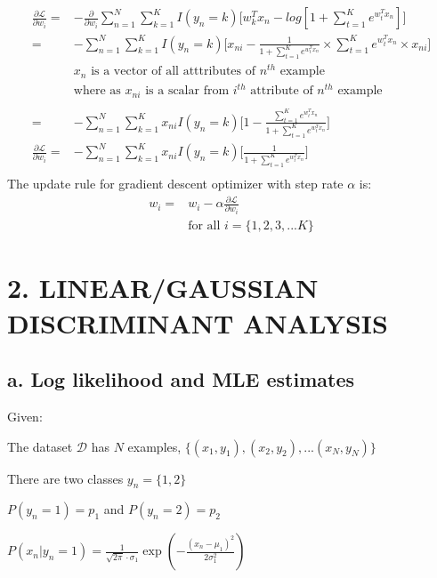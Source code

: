 \documentclass[letterpaper,doc,notimes]{apa6}
\begin{document}
{\begin{align*}
\frac{\partial \mathcal{L}}{\partial w_i} = & - \frac{\partial }{\partial w_i } \sum_{n=1}^{N} \sum_{k=1}^{K} I(y_n = k) \bigg[ w_k^Tx_n - log [1 +  \sum_{t=1}^{K} e^{w_t^Tx_n} ] \bigg ] \\
= & - \sum_{n=1}^{N} \sum_{k=1}^{K} I(y_n = k) \bigg[ x_{ni}  - \frac{1}{1 + \sum_{t=1}^{K} e^{w_t^Tx_n}} \times \sum_{t=1}^{K} e^{w_t^Tx_n} \times x_{ni} \bigg] \\
& \text{$x_n$ is a vector of all atttributes of $n^{th}$ example} 
\\ & \text{where as $x_{ni}$ is a scalar from $i^{th}$ attribute of $n^{th}$ example} \\
\\
= & - \sum_{n=1}^{N} \sum_{k=1}^{K} x_{ni} I(y_n = k) \bigg[ 1  - \frac{\sum_{t=1}^{K} e^{w_t^Tx_n}}{1 + \sum_{t=1}^{K} e^{w_t^Tx_n}}  \bigg] \\
\frac{\partial \mathcal{L}}{\partial w_i} = & - \sum_{n=1}^{N} \sum_{k=1}^{K} x_{ni} I(y_n = k) \bigg[ \frac{1}{1 + \sum_{t=1}^{K} e^{w_t^Tx_n}}  \bigg] \\
\end{align*}
The update rule for gradient descent optimizer with step rate $\alpha$ is: 
\begin{align*}
	w_i = & w_i - \alpha \frac{\partial \mathcal{L}}{\partial w_i} \\
	& \text{for all } i = \{1, 2, 3,...K\}
\end{align*}



\section{2. LINEAR/GAUSSIAN DISCRIMINANT ANALYSIS}

\subsection{a. Log likelihood and MLE estimates}
Given:

The dataset $\mathcal{D}$ has $N$ examples, $\{(x_1,y_1), (x_2, y_2), ...(x_N, y_N)\}$

There are two classes $y_n = \{1, 2\} $

$P(y_n = 1) = p_1$ and $P(y_n = 2) = p_2$

$P(x_n | y_n=1) = \frac{1}{\sqrt{2\pi } \cdot \sigma_1} \exp(-\frac{(x_n-\mu_1)^2}{2\sigma_1^2})$

}
\end{document}
